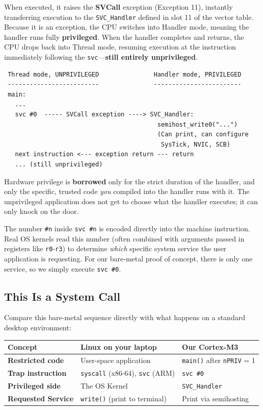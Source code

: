 When executed, it raises the \textbf{SVCall} exception (Exception 11), instantly transferring execution to the \texttt{SVC\_Handler} defined in slot 11 of the vector table. Because it is an exception, the CPU switches into Handler mode, meaning the handler runs fully \textbf{privileged}. When the handler completes and returns, the CPU drops back into Thread mode, resuming execution at the instruction immediately following the \texttt{svc}—\textbf{still entirely unprivileged}.

\begin{lstlisting}
 Thread mode, UNPRIVILEGED               Handler mode, PRIVILEGED
 -------------------------               ------------------------
 main:
   ...
   svc #0  ----- SVCall exception ----> SVC_Handler:
                                          semihost_write0("...")
                                          (Can print, can configure
                                           SysTick, NVIC, SCB)
   next instruction <--- exception return --- return
   ... (still unprivileged)
\end{lstlisting}

Hardware privilege is \textbf{borrowed} only for the strict duration of the handler, and only the specific, trusted code \textit{you} compiled into the handler runs with it. The unprivileged application does not get to choose what the handler executes; it can only knock on the door.

The number \texttt{\#n} inside \texttt{svc \#n} is encoded directly into the machine instruction. Real OS kernels read this number (often combined with arguments passed in registers like \texttt{r0}-\texttt{r3}) to determine \textit{which} specific system service the user application is requesting. For our bare-metal proof of concept, there is only one service, so we simply execute \texttt{svc \#0}.


\subsection{This Is a System Call}
Compare this bare-metal sequence directly with what happens on a standard desktop environment:

\begin{table}[h!]
    \centering
    \begin{tabular}{|l|l|l|}
        \hline
        \textbf{Concept} & \textbf{Linux on your laptop} & \textbf{Our Cortex-M3} \\ \hline
        \textbf{Restricted code} & User-space application & \texttt{main()} after \texttt{nPRIV} = 1 \\ \hline
        \textbf{Trap instruction} & \texttt{syscall} (x86-64), \texttt{svc} (ARM) & \texttt{svc \#0} \\ \hline
        \textbf{Privileged side} & The OS Kernel & \texttt{SVC\_Handler} \\ \hline
        \textbf{Requested Service} & \texttt{write()} (print to terminal) & Print via semihosting \\ \hline
    \end{tabular}
\end{table}

